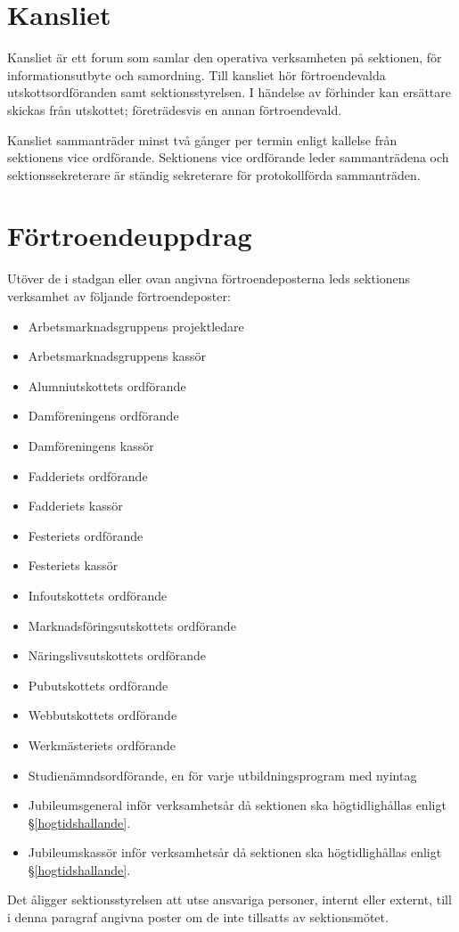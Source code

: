 \documentclass{datateknologsektionen-document}
\begin{document}
\section{Kansliet}
Kansliet är ett forum som samlar den operativa verksamheten på sektionen, för
informationsutbyte och samordning. Till kansliet hör förtroendevalda utskottsordföranden
samt sektionsstyrelsen. I händelse av förhinder kan ersättare skickas från utskottet;
företrädesvis en annan förtroendevald.

Kansliet sammanträder minst två gånger per termin enligt kallelse från sektionens
vice ordförande. Sektionens vice ordförande leder sammanträdena och sektionssekreterare
är ständig sekreterare för protokollförda sammanträden.

\section{Förtroendeuppdrag}
Utöver de i stadgan eller ovan angivna förtroendeposterna leds sektionens verksamhet av följande förtroendeposter:
\begin{itemize}
  \item Arbetsmarknadsgruppens projektledare
  \item Arbetsmarknadsgruppens kassör
  \item Alumniutskottets ordförande
  \item Damföreningens ordförande
  \item Damföreningens kassör
  \item Fadderiets ordförande
  \item Fadderiets kassör
  \item Festeriets ordförande
  \item Festeriets kassör
  \item Infoutskottets ordförande
  \item Marknadsföringsutskottets ordförande
  \item Näringslivsutskottets ordförande
  \item Pubutskottets ordförande
  \item Webbutskottets ordförande
  \item Werkmästeriets ordförande
  \item Studienämndsordförande, en för varje utbildningsprogram med nyintag
  \item Jubileumsgeneral inför verksamhetsår då sektionen ska högtidlighållas enligt \S \ref{hogtidshallande}.
  \item Jubileumskassör inför verksamhetsår då sektionen ska högtidlighållas enligt \S \ref{hogtidshallande}.
\end{itemize}
Det åligger sektionsstyrelsen att utse ansvariga personer, internt eller externt, till i denna paragraf angivna poster om de inte tillsatts av sektionsmötet.
\end{document}

